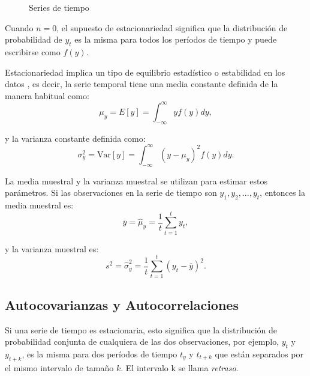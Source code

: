 \begin{figure}[H]
\centering
{}
\caption{Series de tiempo}
\label{serieene}
\end{figure}

Cuando $n=0$, el supuesto de estacionariedad significa que la distribución de probabilidad de $y_{t}$ es la misma para todos los períodos de tiempo y puede escribirse como $f(y)$.

Estacionariedad implica un tipo de equilibrio estadístico o estabilidad en los datos \citep{montgomery}, es decir, la serie temporal tiene una media constante definida de la manera habitual como:
\begin{equation}
\mu_{y} = E[y] = \int_{- \infty}^{\infty} y f(y) dy,
\end{equation}

y la varianza constante definida como:
\begin{equation}
\sigma^{2}_{y} = \text{Var}[y] = \int_{- \infty}^{\infty} (y - \mu_{y})^{2} f(y) dy.
\end{equation}

La media muestral y la varianza muestral se utilizan para estimar estos parámetros. Si las observaciones en la serie de tiempo son $y_{1}, y_{2}, ..., y_{t}$, entonces la media muestral es:
\begin{equation}
\overline{y} = \hat{\mu}_{y} = \frac{1}{t} \sum_{t=1}^{t} y_{t},
\end{equation}

y la varianza muestral es:
\begin{equation}
s^{2} = \hat{\sigma}^{2}_{y} = \frac{1}{t} \sum_{t=1}^{t} (y_{t} - \overline{y})^{2}.
\end{equation}



\subsection{Autocovarianzas y Autocorrelaciones}

Si una serie de tiempo es estacionaria, esto significa que la distribución de probabilidad conjunta de cualquiera de las dos observaciones, por ejemplo, $y_{t}$ y $y_{t+k}$, es la misma para dos períodos de tiempo $t_{y}$ y $t_{t+k}$ que están separados por el mismo intervalo de tamaño $k$. El intervalo k se llama \textit{retraso}.

